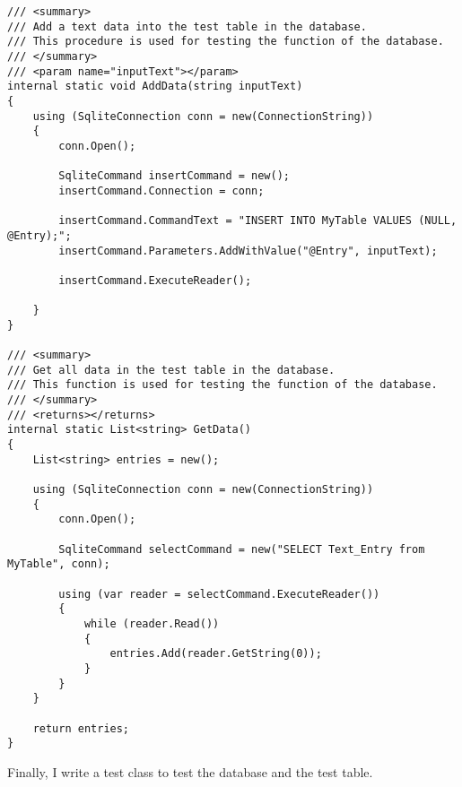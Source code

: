 \documentclass[report.tex]{subfiles}
\begin{document}
\begin{verbatim}
/// <summary>
/// Add a text data into the test table in the database.
/// This procedure is used for testing the function of the database.
/// </summary>
/// <param name="inputText"></param>
internal static void AddData(string inputText)
{
    using (SqliteConnection conn = new(ConnectionString))
    {
        conn.Open();

        SqliteCommand insertCommand = new();
        insertCommand.Connection = conn;

        insertCommand.CommandText = "INSERT INTO MyTable VALUES (NULL, @Entry);";
        insertCommand.Parameters.AddWithValue("@Entry", inputText);

        insertCommand.ExecuteReader();

    }
}

/// <summary>
/// Get all data in the test table in the database.
/// This function is used for testing the function of the database.
/// </summary>
/// <returns></returns>
internal static List<string> GetData()
{
    List<string> entries = new();

    using (SqliteConnection conn = new(ConnectionString))
    {
        conn.Open();

        SqliteCommand selectCommand = new("SELECT Text_Entry from MyTable", conn);

        using (var reader = selectCommand.ExecuteReader())
        {
            while (reader.Read())
            {
                entries.Add(reader.GetString(0));
            }
        }
    }

    return entries;
}
\end{verbatim}

Finally, I write a test class to test the database and the test table.
\end{document}
